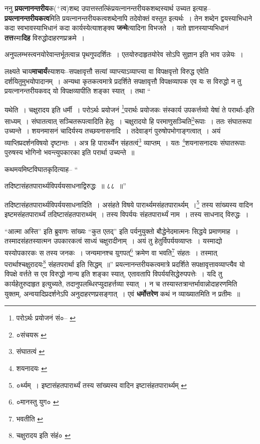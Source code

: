 \documentclass[article,12pt,a4paper]{memoir}
\newcommand{\add}[1]{($^{+}$#1)}
\begin{document}
	  \pstart ननु \textbf{प्रयत्नानन्तरीय}क\add{त्व}शब्द उपात्तस्तत्किंप्रयत्नानन्तरीयकशब्दस्यार्थ उच्यत इत्याह--\textbf{प्रयत्नानन्तरीयकत्व}मिति प्रयत्नानन्तरीयकत्वशब्देनापि तदेवोक्तं वस्तुत इत्यर्थः । तेन शब्देन द्वयस्याभिधाने कदा स्वभावस्याभिधानं कदा कार्यस्येत्याशङ्क्य \textbf{जन्मे}त्यादिना विभजते । यतो ज्ञानस्याप्यभिधानं \textbf{तत्त}स्मा\textbf{दिह} विरुद्धोदाहरणप्रक्रमे ।
	\pend
      

	  \pstart अनुपलम्भस्त्वनयोरेवान्तर्भूतत्वान्न पृथगुपदर्शितः । एतयोरुदाहृतयोरेव सोऽपि सुज्ञान इति भाव उन्नेयः ।
	\pend
      

	  \pstart लक्ष्यते चाय\textbf{माचार्यं}स्याशयः--सपक्षावृत्तौ सत्यां व्याप्त्याऽव्याप्त्या वा विपक्षवृत्तो विरुद्ध एवेति दर्शयितुमुभयोपादानम् । अन्यथा कृतकत्वमात्रे प्रदर्शिते सपक्षावृत्तौ विपक्षव्यापक एव यः स विरुद्धो न तु प्रयत्नानन्तरीयकवद् यो विपक्षव्यापीति शङ्का स्यात् । तथा  \leavevmode{} “
	  
	यथेति । चक्षुरादय इति धर्मी । परोऽर्थः प्रयोजनं \footnote{परोऽर्थः प्रयोजनं सं०--\cite{dp-msA} \cite{dp-msB} \cite{dp-msC} \cite{dp-msD} \cite{dp-edP} \cite{dp-edH} \cite{dp-edE} \cite{dp-edN}}परार्थः प्रयोजकः संस्कार्य उपकर्त्तव्यो येषां ते परार्थाः-इति साध्यम् । संघातत्वात् सञ्चितरूपत्वादिति हेतुः । चक्षुरादयो हि परमाणुसञ्चिति\footnote{०संचयरू \cite{dp-msC} \cite{dp-msD}}रूपाः । ततः संघातरूपा उच्यन्ते । शयनमासनं चादिर्यस्य तच्छयनासनादि । तदेवाङ्गं पुरुषोपभोगाङ्गत्वात् । अयं व्याप्तिप्रदर्शनविषयो दृष्टान्तः । अत्र हि पारार्थ्येन संहतत्वं\footnote{संघातत्वं \cite{dp-msD}} व्याप्तम् । यतः \footnote{शयनादयः \cite{dp-msD}}शयनासनादयः संघातरूपाः पुरुषस्य भोगिनो भवन्त्युपकारका इति परार्था उच्यन्ते ॥ 
	  
	कथमयमिष्टविघातकृदित्याह-- “
	  
	तदिष्टासंहतपारार्थ्यविपर्ययसाधनाद्विरुद्धः ॥ ८८ ॥” 
	  
	तदिष्टासंहतपारार्थ्यविपर्ययसाधनादिति । असंहते विषये पारार्थ्यमसंहतपारार्थ्यम् ।\footnote{०र्थ्यम् । इष्टासंहतपारार्थ्यं तस्य सांख्यस्य वादिन इष्टासंहतपारार्थ्यम् \cite{dp-msC} \cite{dp-msD}} तस्य सांख्यस्य वादिन इष्टमसंहतपारार्थ्यं तदिष्टासंहतपाराथ्यंम् । तस्य विपर्ययः संहतपारार्थ्यं नाम । तस्य साधनाद् विरुद्धः । 
	  
	“आत्मा अस्ति” इति ब्रुवाणः सांख्यः “कुत एतद्” इति पर्यनुयुक्तो बौद्धेनेदमात्मनः सिद्धये प्रमाणमाह । तस्मादसंहतस्यात्मन उपकारकत्वं साध्यं चक्षुरादीनाम् । अयं तु हेतुर्विपर्ययव्याप्तः । यस्माद्यो यस्योपकारकः स तस्य जनकः । जन्यमानश्च युगपत्\footnote{०मानस्तु युग० \cite{dp-msD}} क्रमेण वा भवति\footnote{भवतीति \cite{dp-msD}} संहतः । तस्मात् परार्थाश्चक्षुरादयः\footnote{चक्षुरादय इति संहं० \cite{dp-msA} \cite{dp-msB} \cite{dp-edP} \cite{dp-edH} \cite{dp-edN}} संहतपरार्था इति सिद्धम् ॥” प्रयत्नानन्तरीयकत्वमात्रे प्रदर्शिते सपक्षावृत्तावव्याप्त्यैव यो विपक्षे वर्त्तते स एव विरुद्धो नान्य इति शङ्का स्यात्, एतावतापि \leavevmode{} विपर्ययसिद्धेरुपपत्तेः । यदि तु कार्यहेतुरुदाहृत इत्युच्यते, तदानुपलब्धिरप्युदाहर्त्तव्या स्यात् । न च तस्यास्तत्रान्तर्भावान्नोदाहरणमिति युक्तम्, अन्वयादिप्रदर्शनेऽपि अनुदाहरणप्रसङ्गात् । एवं \textbf{धर्मोत्तरेण} कथं न व्याख्यातमिति न प्रतीमः ॥
	\pend
      
\end{document}
